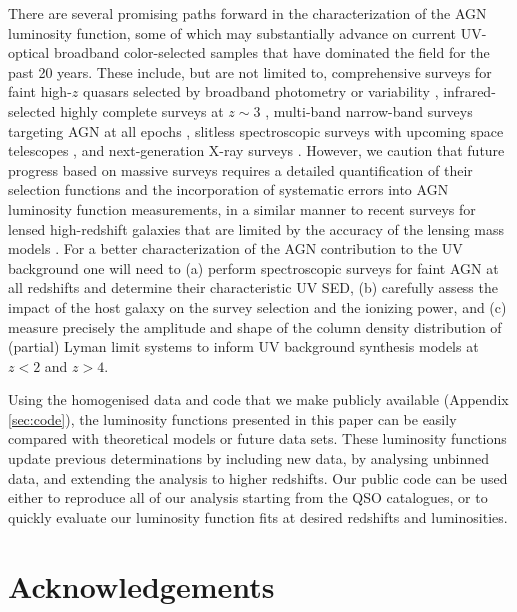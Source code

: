\documentclass[fleqn,usenatbib]{mnras}
\newcommand{\new}[1]{{\color{notecolor} #1}}
\begin{document}
There are several promising paths forward in the characterization of
the AGN luminosity function, some of which may substantially advance
on current UV-optical broadband color-selected samples that have
dominated the field for the past 20 years.  These include, but are not
limited to, comprehensive surveys for faint high-$z$ quasars selected
by broadband photometry \citep{2016ApJ...828...26M,
  2017ApJ...839...27W} or variability \citep{2017MNRAS.464.1693H},
infrared-selected highly complete surveys at $z\sim 3$
\citep{2017ApJ...851...13S, 2018AJ....155..110Y}, multi-band
narrow-band surveys targeting AGN at all epochs
\citep{2014arXiv1403.5237B}, slitless spectroscopic surveys with
upcoming space telescopes \citep{2011arXiv1110.3193L,
  2013arXiv1305.5422S}, and next-generation X-ray surveys
\citep[e.g.][]{2013A&A...558A..89K}. However, we caution that future
progress based on massive surveys requires a detailed quantification
of their selection functions and the incorporation of systematic
errors into AGN luminosity function measurements, in a similar manner
to recent surveys for lensed high-redshift galaxies that are limited
by the accuracy of the lensing mass models \citep{2017ApJ...843..129B,
  2018ApJ...854...73I, 2018arXiv180309747A}.  For a better
characterization of the AGN contribution to the UV background one will
need to (a) perform spectroscopic surveys for faint AGN at all
redshifts and determine their characteristic UV SED, (b) carefully
assess the impact of the host galaxy on the survey selection and the
ionizing power, and (c) measure precisely the amplitude and shape of
the column density distribution of (partial)  Lyman limit
systems to inform UV background synthesis models at $z<2$ and $z>4$.

Using the homogenised data and code that we make publicly available
(Appendix \ref{sec:code}), the luminosity functions presented in this
paper can be easily compared with theoretical models or future data
sets.  \new{These luminosity functions update previous determinations
  by including new data, by analysing unbinned data, and extending the
  analysis to higher redshifts.}  Our public code can be used either
to reproduce all of our analysis starting from the QSO catalogues, or
to quickly evaluate our luminosity function fits at desired redshifts
and luminosities.

\section*{Acknowledgements}
\end{document}
